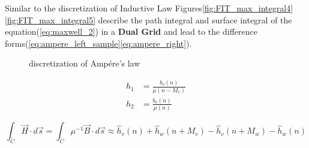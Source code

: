 Similar to the discretization of Inductive Law Figures\ref{fig:FIT_max_integral4}\ref{fig:FIT_max_integral5} describe the path integral and surface integral of the equation(\ref{eq:maxwell_2}) in a \textbf{Dual Grid} and lead to the difference forms(\ref{eq:ampere_left_sample}\ref{eq:ampere_right}).

\begin{figure}
\hfill
\caption{discretization of Amp\'ere's law}
\end{figure}

\begin{align}
h_{1}&=\frac{b_{v}(n)}{\mu (n-M_{v})}\\
h_{2}&=\frac{b_{v}(n)}{\mu (n)}
\label{eq:megnetic_field}
\end{align}

%

\begin{equation}
\int_{\tilde{C}}\vec{H}\cdot d\vec{s}=\int_{\tilde{C}}\mu^{-1}\vec{B}\cdot d\vec{s}\approx
\widehat{h}_{v}(n)
+\widehat{h}_{w}(n+M_{v})
-\widehat{h}_{v}(n+M_{w})
-\widehat{h}_{w}(n)
\label{eq:ampere_left_sample}
\end{equation}

